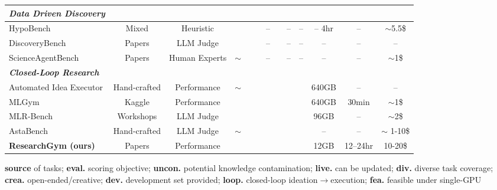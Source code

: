 \documentclass[11pt]{article}
\let\cite\citep
\newcommand{\gtick}{\textcolor{green!60!black}{\ding{51}}}
\newcommand{\rcross}{\textcolor{red!70!black}{\ding{55}}}
\theoremstyle{plain}
\theoremstyle{definition}
\theoremstyle{remark}
\begin{document}
\begin{table}[ht]
{\begin{tabularx}{1.2\textwidth}{@{}l*{12}{c}}
\midrule
\textbf{\emph{Data Driven Discovery}} &  &  &  &  &  &  &  &  &  \\
\midrule
HypoBench \cite{liu2025hypobenchsystematicprincipledbenchmarking} & Mixed  & Heuristic     & \rcross & \rcross & \gtick & -- & \rcross & -- & -- & -- 4hr & -- & $\sim$5.5\$\\
DiscoveryBench \cite{majumder2025discoverybench}                  & Papers & LLM Judge    & \rcross & \rcross & \gtick & -- & \gtick & -- & -- & -- & -- & --\\
ScienceAgentBench \cite{chen2025scienceagentbench}                                         & Papers & Human Experts & $\sim$  & \rcross & \gtick & -- & \rcross & -- & -- & -- & -- & $\sim$1\$\\
\midrule
\textbf{\emph{Closed-Loop Research}} &  &  &  &  &  &  &  &  &  \\
\midrule
Automated Idea Executor \cite{si2026executiongroundedautomatedairesearch} & Hand-crafted & Performance & $\sim$ & \rcross & \rcross & \gtick & \rcross & \gtick & \rcross & 640GB & -- & -- \\
MLGym \cite{nathani2025mlgymnewframeworkbenchmark} & Kaggle & Performance & \rcross & \rcross & \gtick & \rcross & \rcross & \gtick & \rcross & 640GB & 30min & $\sim$1\$\\
MLR-Bench \cite{chen2025mlrbenchevaluatingaiagents} & Workshops & LLM Judge & \rcross & \gtick & \gtick & \gtick & \rcross & \rcross & \rcross & 96GB & -- & $\sim$2\$ \\
AstaBench \cite{bragg2025astabench}         & Hand-crafted & LLM Judge & $\sim$ & \rcross & \rcross & \gtick & \gtick & \gtick & \rcross & -- & -- & $\sim$ 1-10\$\\
\midrule
\textbf{ResearchGym (ours)} & Papers & Performance & \gtick & \gtick & \gtick & \gtick & \gtick & \gtick & \gtick & 12GB & 12--24hr & 10-20\$\\
\bottomrule
\end{tabularx}
}

\vspace{4pt}
\raggedright\footnotesize
\textbf{source} of tasks;
\textbf{eval.} scoring objective;
\textbf{uncon.} potential knowledge contamination;
\textbf{live.} can be updated;
\textbf{div.} diverse task coverage;
\textbf{crea.} open-ended/creative;
\textbf{dev.} development set provided;
\textbf{loop.} closed-loop ideation$\to$execution;
\textbf{fea.} feasible under single-GPU
\end{table}
\end{document}
